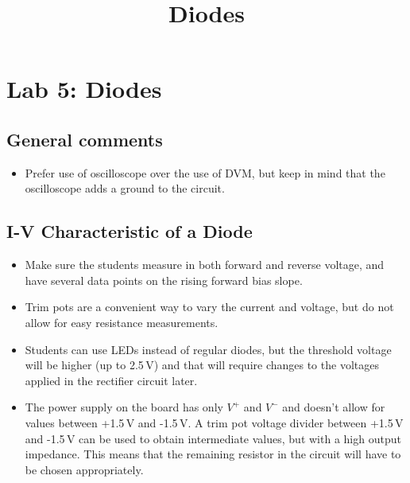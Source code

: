 \documentclass{article}
\title{Diodes}
\begin{document}
\maketitle

\section{Lab 5: Diodes}

\subsection*{General comments}

\begin{itemize}
\item Prefer use of oscilloscope over the use of DVM, but keep in mind that the oscilloscope adds a ground to the circuit.
\end{itemize}

\subsection{I-V Characteristic of a Diode}
\begin{itemize}
\item Make sure the students measure in both forward and reverse voltage, and have several data points on the rising forward bias slope.
\item Trim pots are a convenient way to vary the current and voltage, but do not allow for easy resistance measurements.
\item Students can use LEDs instead of regular diodes, but the threshold voltage will be higher (up to 2.5\,V) and that will require changes to the voltages applied in the rectifier circuit later.
\item The power supply on the board has only $V^+$ and $V^-$ and doesn't allow for values between +1.5\,V and -1.5\,V.  A trim pot voltage divider between +1.5\,V and -1.5\,V can be used to obtain intermediate values, but with a high output impedance.  This means that the remaining resistor in the circuit will have to be chosen appropriately.
\end{itemize}
\end{document}
